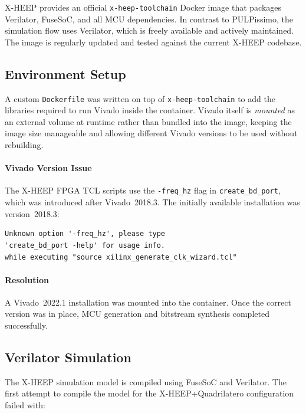 \documentclass[journal]{IEEEtran}
\begin{document}
X-HEEP provides an official \texttt{x-heep-toolchain} Docker image that
packages Verilator, FuseSoC, and all MCU dependencies. In contrast to
PULPissimo, the simulation flow uses Verilator, which is freely available
and actively maintained. The image is regularly updated and tested against
the current X-HEEP codebase.

\subsection{Environment Setup}
\label{subsec:env}

A custom \texttt{Dockerfile} was written on top of \texttt{x-heep-toolchain}
to add the libraries required to run Vivado inside the container. Vivado
itself is \emph{mounted} as an external volume at runtime rather than bundled
into the image, keeping the image size manageable and allowing different
Vivado versions to be used without rebuilding.

\paragraph{Vivado Version Issue}

The X-HEEP FPGA TCL scripts use the \texttt{-freq\_hz} flag in
\texttt{create\_bd\_port}, which was introduced after Vivado~2018.3. The
initially available installation was version~2018.3:

\begin{lstlisting}
Unknown option '-freq_hz', please type
'create_bd_port -help' for usage info.
while executing "source xilinx_generate_clk_wizard.tcl"
\end{lstlisting}

\paragraph{Resolution} A Vivado~2022.1 installation was mounted into the
container. Once the correct version was in place, MCU generation and
bitstream synthesis completed successfully.

\subsection{Verilator Simulation}
\label{subsec:verilator}

The X-HEEP simulation model is compiled using FuseSoC and Verilator. The
first attempt to compile the model for the X-HEEP+Quadrilatero configuration
failed with:
\end{document}
